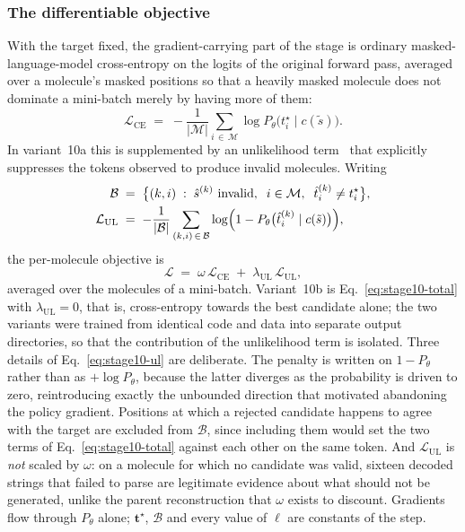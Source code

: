 \documentclass[a4paper,12pt]{article}
\begin{document}
\subsubsection{The differentiable objective}

With the target fixed, the gradient-carrying part of the stage is ordinary
masked-language-model cross-entropy on the logits of the original forward pass,
averaged over a molecule's masked positions so that a heavily masked molecule
does not dominate a mini-batch merely by having more of them:
\begin{equation}
\mathcal{L}_{\mathrm{CE}} \;=\; -\frac{1}{|\mathcal{M}|}
\sum_{i \,\in\, \mathcal{M}} \log P_{\theta}\bigl(t^{\star}_i \mid c(\tilde{s})\bigr).
\label{eq:stage10-ce}
\end{equation}
In variant~10a this is supplemented by an unlikelihood
term~\cite{welleck2020unlikelihood} that explicitly suppresses the tokens
observed to produce invalid molecules. Writing
\begin{align}
\mathcal{B} \;&=\; \bigl\{ (k,i) \;:\; \hat{s}^{(k)}\ \text{invalid},\;\;
i \in \mathcal{M},\;\; \hat{t}^{(k)}_i \neq t^{\star}_i \bigr\}, \notag \\
\mathcal{L}_{\mathrm{UL}} \;&=\; -\frac{1}{|\mathcal{B}|}
\sum_{(k,i) \,\in\, \mathcal{B}}
\log\Bigl(1 - P_{\theta}\bigl(\hat{t}^{(k)}_i \mid c(\tilde{s})\bigr)\Bigr),
\label{eq:stage10-ul}
\end{align}
the per-molecule objective is
\begin{equation}
\mathcal{L} \;=\; \omega\,\mathcal{L}_{\mathrm{CE}}
\;+\; \lambda_{\mathrm{UL}}\,\mathcal{L}_{\mathrm{UL}},
\label{eq:stage10-total}
\end{equation}
averaged over the molecules of a mini-batch. Variant~10b is
Eq.~\eqref{eq:stage10-total} with $\lambda_{\mathrm{UL}}=0$, that is,
cross-entropy towards the best candidate alone; the two variants were trained
from identical code and data into separate output directories, so that the
contribution of the unlikelihood term is isolated. Three details of
Eq.~\eqref{eq:stage10-ul} are deliberate. The penalty is written on
$1-P_{\theta}$ rather than as $+\log P_{\theta}$, because the latter diverges as
the probability is driven to zero, reintroducing exactly the unbounded direction
that motivated abandoning the policy gradient. Positions at which a rejected
candidate happens to agree with the target are excluded from $\mathcal{B}$,
since including them would set the two terms of Eq.~\eqref{eq:stage10-total}
against each other on the same token. And $\mathcal{L}_{\mathrm{UL}}$ is
\emph{not} scaled by $\omega$: on a molecule for which no candidate was valid,
sixteen decoded strings that failed to parse are legitimate evidence about what
should not be generated, unlike the parent reconstruction that $\omega$ exists
to discount. Gradients flow through $P_{\theta}$ alone; $\mathbf{t}^{\star}$,
$\mathcal{B}$ and every value of $\ell$ are constants of the step.
\end{document}

